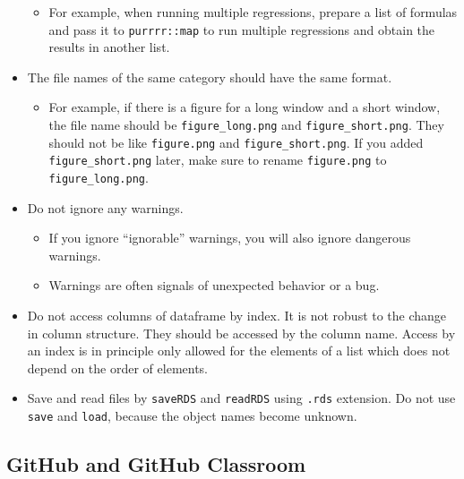 \documentclass[
]{book}
\providecommand{\tightlist}{%
  \setlength{\itemsep}{0pt}\setlength{\parskip}{0pt}}
\begin{document}
\begin{itemize}
  \begin{itemize}
  \tightlist
  \item
    For example, when running multiple regressions, prepare a list of formulas and pass it to \texttt{purrrr::map} to run multiple regressions and obtain the results in another list.
  \end{itemize}
\item
  The file names of the same category should have the same format.

  \begin{itemize}
  \tightlist
  \item
    For example, if there is a figure for a long window and a short window, the file name should be \texttt{figure\_long.png} and \texttt{figure\_short.png}. They should not be like \texttt{figure.png} and \texttt{figure\_short.png}. If you added \texttt{figure\_short.png} later, make sure to rename \texttt{figure.png} to \texttt{figure\_long.png}.
  \end{itemize}
\item
  Do not ignore any warnings.

  \begin{itemize}
  \tightlist
  \item
    If you ignore ``ignorable'' warnings, you will also ignore dangerous warnings.
  \item
    Warnings are often signals of unexpected behavior or a bug.
  \end{itemize}
\item
  Do not access columns of dataframe by index. It is not robust to the change in column structure. They should be accessed by the column name. Access by an index is in principle only allowed for the elements of a list which does not depend on the order of elements.
\item
  Save and read files by \texttt{saveRDS} and \texttt{readRDS} using \texttt{.rds} extension. Do not use \texttt{save} and \texttt{load}, because the object names become unknown.
\end{itemize}

\hypertarget{github-and-github-classroom}{%
\subsection{GitHub and GitHub Classroom}\label{github-and-github-classroom}}
\end{document}
